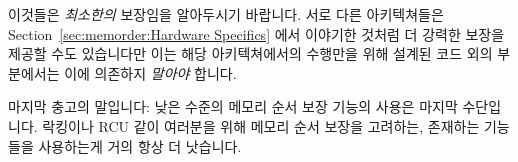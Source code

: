 이것들은 \emph{최소한의} 보장임을 알아두시기 바랍니다.
서로 다른 아키텍쳐들은
Section~\ref{sec:memorder:Hardware Specifics}
에서 이야기한 것처럼 더 강력한 보장을 제공할 수도 있습니다만 이는 해당
아키텍쳐에서의 수행만을 위해 설계된 코드 외의 부분에서는 이에 의존하지
\emph{말아야} 합니다.

마지막 충고의 말입니다: 낮은 수준의 메모리 순서 보장 기능의 사용은 마지막
수단입니다.
락킹이나 RCU 같이 여러분을 위해 메모리 순서 보장을 고려하는, 존재하는 기능들을
사용하는게 거의 항상 더 낫습니다.

